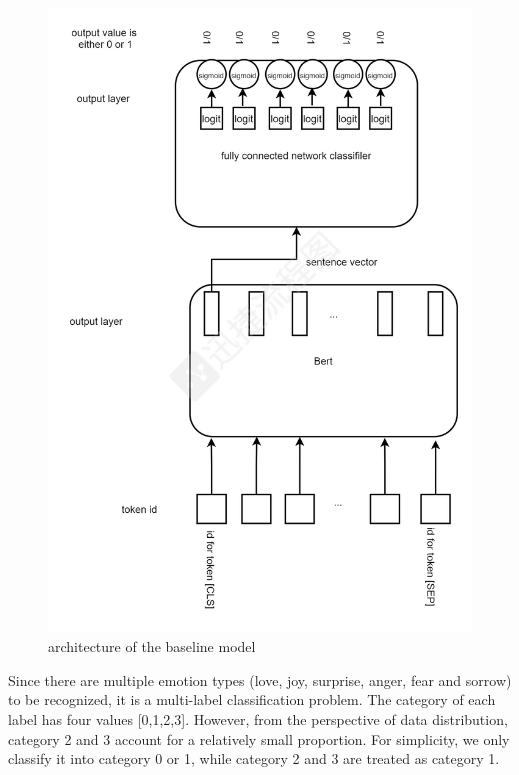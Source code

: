 \documentclass[12pt,twocolumn,letterpaper]{article}
\begin{document}
\begin{figure}
\begin{center}
\includegraphics[scale=0.22]{Method1.png}
\end{center}
   \caption{architecture of the baseline model}
\label{fig:short}
\end{figure}


 Since there are multiple emotion types (love, joy, surprise, anger, fear and sorrow) to be recognized, it is a multi-label classification problem. The category of each label has four values [0,1,2,3]. However, from the perspective of data distribution, category 2 and 3 account for a relatively small proportion. For simplicity, we only classify it into category 0 or 1, while category 2 and 3 are treated as category 1. 
 
\end{document}
